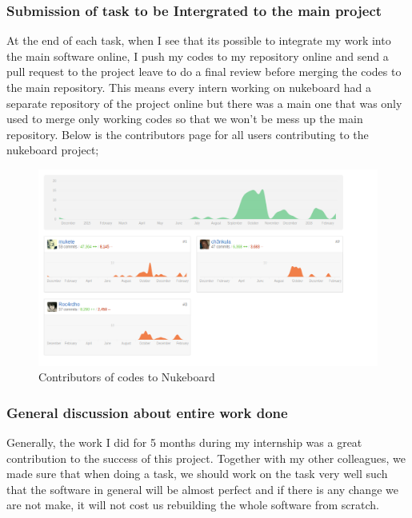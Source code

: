 \subsubsection{Submission of task to be Intergrated to the main project}

At the end of each task, when I see that its possible to integrate my work into the main software online, I push my codes to my repository online and send a pull request to the project leave to do a final review before merging the codes to the main repository. This means every intern working on nukeboard had a separate  repository of the project online but there was a main one that was only used to merge only working codes so that we won't be mess up the main repository. Below is the contributors page for all users contributing to the nukeboard project;

\begin{figure}[h]
\centering
\includegraphics[width=13cm,scale=1.5]{Figures/GitHubProject}
\decoRule
\caption[Nukeboard Code Contributors]{Contributors of codes to Nukeboard}
\label{fig:GitHubProject}
\end{figure}

\subsubsection{General discussion about entire work done}

   Generally, the work I did for 5 months during my internship was a great contribution to the success of this project. Together with my other colleagues, we made sure that when doing a task, we should work on the task very well such that the software in general will be almost perfect and if there is any change we are not make, it will not cost us rebuilding the whole software from scratch. \\
   
